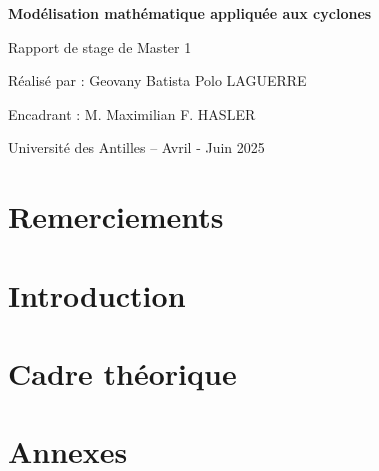 \documentclass[12pt,a4paper]{report}
\begin{document}
\begin{titlepage}
    \centering
    \vspace*{2cm}
    {\LARGE\bfseries Modélisation mathématique appliquée aux cyclones \par}
    \vspace{2cm}
    {\Large Rapport de stage de Master 1 \par}
    \vfill
    {\large Réalisé par : Geovany Batista Polo LAGUERRE \par}
    {\large Encadrant : M. Maximilian F. HASLER \par}
    \vfill
    {\large Université des Antilles – Avril - Juin 2025 \par}
\end{titlepage}

\tableofcontents
\newpage

\chapter*{Remerciements}

\chapter{Introduction}


\chapter{Cadre théorique}


\appendix
\chapter{Annexes}

\newpage


\end{document}
